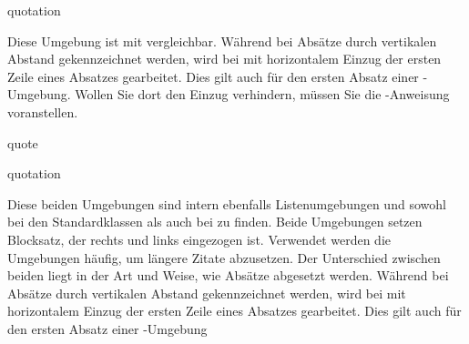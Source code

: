     \begin{Declaration}
      \begin{Environment}{quotation}\end{Environment}
    \end{Declaration}%
    Diese
    Umgebung ist mit
     vergleichbar. Während bei
     Absätze durch vertikalen Abstand
    gekennzeichnet werden, wird bei  mit horizontalem
    Einzug der ersten Zeile eines Absatzes gearbeitet. Dies gilt auch für den
    ersten Absatz einer -Umgebung. Wollen Sie dort den
    Einzug verhindern, müssen Sie die
    -Anweisung voranstellen.%
    \else
    \begin{Declaration}
      \begin{Environment}{quote}\end{Environment}
      \begin{Environment}{quotation}\end{Environment}
    \end{Declaration}%
    Diese beiden
    Umgebungen sind intern ebenfalls Listenumgebungen
    und sowohl bei den Standardklassen als auch bei {\KOMAScript} zu finden.
    Beide Umgebungen setzen Blocksatz, der rechts und links eingezogen
    ist. Verwendet werden die Umgebungen häufig, um längere
    Zitate abzusetzen. Der Unterschied zwischen beiden liegt in
    der Art und Weise, wie Absätze abgesetzt werden. Während bei
     Absätze durch vertikalen Abstand gekennzeichnet
    werden, wird bei  mit horizontalem Einzug der
    ersten Zeile eines Absatzes gearbeitet. Dies gilt auch für den ersten
    Absatz einer -Umgebung%
    \fi %

